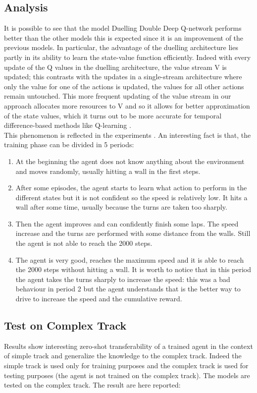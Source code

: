 \documentclass[14pt]{extarticle}
\def\sp{\vspace{5pt}}
\def\pp{\vspace{10pt}\newline}
\begin{document}
\begin{flushleft}
\subsection{Analysis}
\sp
It is possible to see that the model Duelling Double Deep Q-network performs better than the other models this is expected since it is an improvement of the previous models. 
\pp
In particular, the advantage of the duelling architecture lies partly in its ability to learn the state-value function efficiently. Indeed with every update of the Q values in the duelling architecture, the value stream V is updated; this contrasts with the updates in a single-stream architecture where only the value for one of the actions is updated, the values for all other actions remain untouched. This more frequent updating of the value stream in our approach allocates more resources to V and so it allows for better approximation of the state values, which it turns out to be more accurate for temporal difference-based methods like Q-learning \cite{DDDQN1}. \\
This phenomenon is reflected in the experiments .
\pp
An interesting fact is that, the training phase can be divided in 5 periods:
\begin{enumerate}
\item At the beginning the agent does not know anything about the environment and moves randomly, usually hitting a wall in the first steps.
\item After some episodes, the agent starts to learn what action to perform in the different states but it is not confident so the speed is relatively low. It hits a wall after some time, usually because the turns are taken too sharply.
\item Then the agent improves and can confidently finish some laps. The speed increase and the turns are performed with some distance from the walls. Still the agent is not able to reach the 2000 steps.
\item The agent is very good, reaches the maximum speed and it is able to reach the 2000 steps without hitting a wall. It is worth to notice that in this period the agent takes the turns sharply to increase the speed: this was a bad behaviour in period 2 but the agent understands that is the better way to drive to increase the speed and the cumulative reward.
\end{enumerate}

\subsection{Test on Complex Track}
\sp
Results show interesting zero-shot transferability \cite{Zero-shot} of a trained agent in the context of simple track and generalize the knowledge to the complex track. Indeed the simple track is used only for training purposes and the complex track is used for testing purposes (the agent is not trained on the complex track).
\pp
The models are tested on the complex track. The result are here reported:


\end{flushleft}
\end{document}
